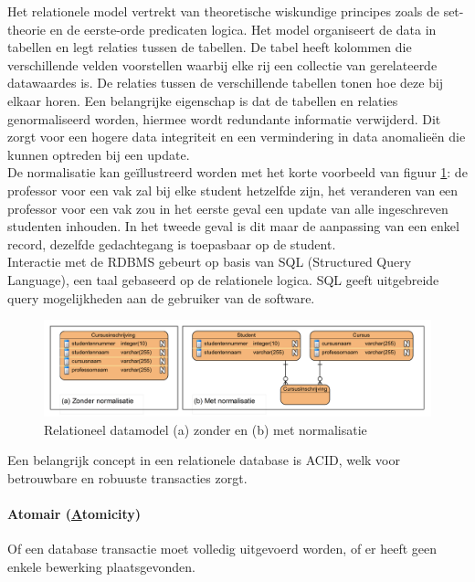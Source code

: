 Het relationele model vertrekt van theoretische wiskundige principes zoals de set-theorie en de eerste-orde predicaten logica. Het model organiseert de data in tabellen en legt relaties tussen de tabellen. De tabel heeft kolommen die verschillende velden voorstellen waarbij elke rij een collectie van gerelateerde datawaardes is. De relaties tussen de verschillende tabellen tonen hoe deze bij elkaar horen. Een belangrijke eigenschap is dat de tabellen en relaties genormaliseerd worden, hiermee wordt redundante informatie verwijderd. Dit zorgt voor een hogere data integriteit en een vermindering in data anomalieën die kunnen optreden bij een update.\cite{Elmasri:2010:FDS:1855347} \\
De normalisatie kan geïllustreerd worden met het korte voorbeeld van figuur \ref{fig:Relationeel-Model-Normalisatie}: de professor voor een vak zal bij elke student hetzelfde zijn, het veranderen van een professor voor een vak zou in het eerste geval een update van alle ingeschreven studenten inhouden. In het tweede geval is dit maar de aanpassing van een enkel record, dezelfde gedachtegang is toepasbaar op de student. \\
Interactie met de RDBMS gebeurt op basis van SQL (Structured Query Language), een taal gebaseerd op de relationele logica. SQL geeft uitgebreide query mogelijkheden aan de gebruiker van de software.   
\begin{figure}[ht!]
\centering
\includegraphics[width=\linewidth]{img/Relationeel-Model-Normalisatie.png}
\caption[Relationeel datamodel (a) zonder en (b) met normalisatie]{Relationeel datamodel (a) zonder en (b) met normalisatie}
\label{fig:Relationeel-Model-Normalisatie}
\end{figure}

Een belangrijk concept in een relationele database is ACID, welk voor betrouwbare en robuuste transacties zorgt. 

\paragraph{Atomair (\underline{A}tomicity)} Of een database transactie moet volledig uitgevoerd worden, of er heeft geen enkele bewerking plaatsgevonden. 

